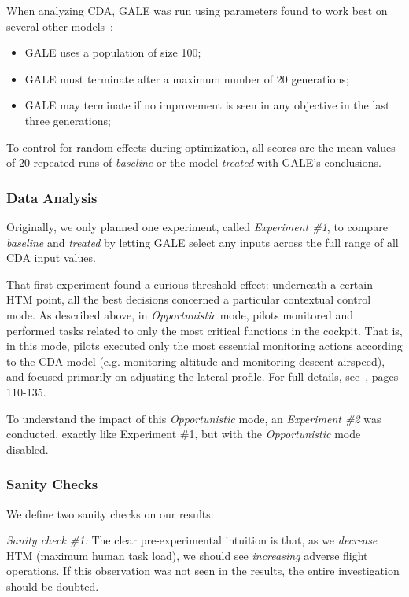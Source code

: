\documentclass[journal]{IEEEtran}
\newcommand{\bi}{\begin{itemize}}
\newcommand{\ei}{\end{itemize}}
\newenvironment{changed}{\par}{\par}
\begin{document}
When analyzing CDA, GALE was run using  parameters found to work best on several other models~\cite{krallphd}:
\bi
\item GALE uses a population of size 100;
\item GALE must  terminate after a maximum number of 20 generations;
\item GALE may terminate if no improvement is seen in any objective in the last three generations;
\ei
To control for random effects during optimization, all scores are the mean values of 20 repeated runs of {\em baseline} or  the model {\em treated} with GALE's conclusions.

\subsubsection{Data Analysis}
Originally, we only planned one experiment, called {\em Experiment \#1},  to compare {\em baseline} and {\em treated} by letting GALE select any inputs across the full range of all CDA input values.

\begin{changed}
That first experiment found a curious threshold effect: underneath a certain HTM point, all the best decisions concerned a particular contextual control mode.  
As described above, in {\em Opportunistic} mode, pilots monitored and performed tasks related to only the most critical functions in the cockpit. 
That is, in this mode, pilots executed only the most essential monitoring actions according to the CDA model (e.g. monitoring altitude and monitoring descent airspeed), and focused primarily on adjusting the lateral profile.  For full details, see~\cite{Kim2011}, pages 110-135.
\end{changed}

To  understand the impact of this {\em Opportunistic} mode, an {\em Experiment \#2} was conducted, exactly like Experiment \#1, but with the {\em Opportunistic} mode  disabled.

\subsubsection{Sanity Checks}
We define two  sanity checks on our results:

{\em Sanity check \#1:}
The clear pre-experimental intuition is that, as we 
{\em decrease}
HTM (maximum human task load), we should see {\em increasing} adverse flight operations. 
If this observation was not seen in the results, the entire investigation should be doubted.
\end{document}
